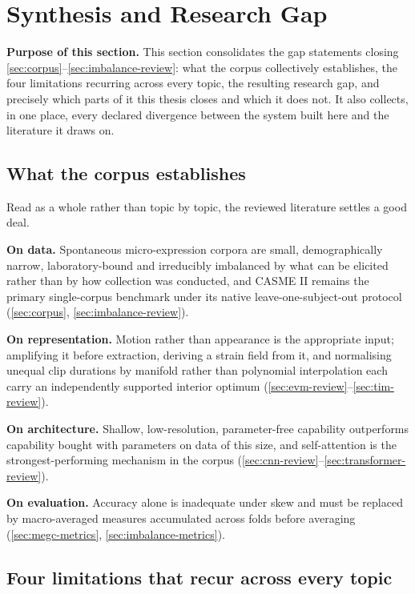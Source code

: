 \section{Synthesis and Research Gap}
\label{sec:synthesis-and-gap}

\textbf{Purpose of this section.} This section consolidates the gap statements closing \autoref{sec:corpus}--\autoref{sec:imbalance-review}: what the corpus collectively establishes, the four limitations recurring across every topic, the resulting research gap, and precisely which parts of it this thesis closes and which it does not. It also collects, in one place, every declared divergence between the system built here and the literature it draws on.

\subsection{What the corpus establishes}
\label{sec:corpus-establishes}

Read as a whole rather than topic by topic, the reviewed literature settles a good deal.

\textbf{On data.} Spontaneous micro-expression corpora are small, demographically narrow, laboratory-bound and irreducibly imbalanced by what can be elicited rather than by how collection was conducted, and CASME II remains the primary single-corpus benchmark under its native leave-one-subject-out protocol (\autoref{sec:corpus}, \autoref{sec:imbalance-review}).

\textbf{On representation.} Motion rather than appearance is the appropriate input; amplifying it before extraction, deriving a strain field from it, and normalising unequal clip durations by manifold rather than polynomial interpolation each carry an independently supported interior optimum (\autoref{sec:evm-review}--\autoref{sec:tim-review}).

\textbf{On architecture.} Shallow, low-resolution, parameter-free capability outperforms capability bought with parameters on data of this size, and self-attention is the strongest-performing mechanism in the corpus (\autoref{sec:cnn-review}--\autoref{sec:transformer-review}).

\textbf{On evaluation.} Accuracy alone is inadequate under skew and must be replaced by macro-averaged measures accumulated across folds before averaging (\autoref{sec:megc-metrics}, \autoref{sec:imbalance-metrics}).

\subsection{Four limitations that recur across every topic}
\label{sec:four-limitations}

